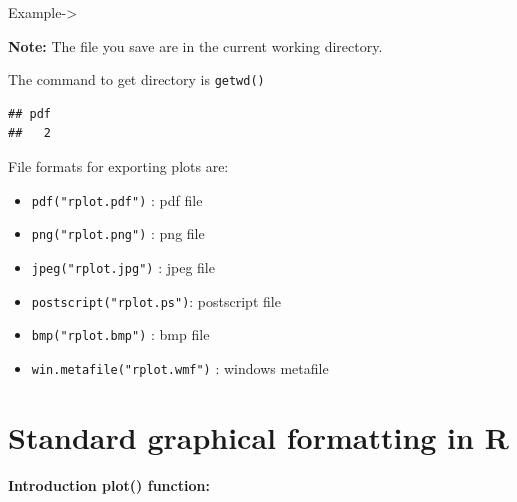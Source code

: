 \documentclass[]{book}
\newenvironment{Shaded}{\begin{snugshade}}{\end{snugshade}}
\newcommand{\KeywordTok}[1]{\textcolor[rgb]{0.13,0.29,0.53}{\textbf{#1}}}
\newcommand{\DataTypeTok}[1]{\textcolor[rgb]{0.13,0.29,0.53}{#1}}
\newcommand{\DecValTok}[1]{\textcolor[rgb]{0.00,0.00,0.81}{#1}}
\newcommand{\StringTok}[1]{\textcolor[rgb]{0.31,0.60,0.02}{#1}}
\newcommand{\CommentTok}[1]{\textcolor[rgb]{0.56,0.35,0.01}{\textit{#1}}}
\newcommand{\OtherTok}[1]{\textcolor[rgb]{0.56,0.35,0.01}{#1}}
\newcommand{\OperatorTok}[1]{\textcolor[rgb]{0.81,0.36,0.00}{\textbf{#1}}}
\newcommand{\NormalTok}[1]{#1}
\begin{document}
Example-\textgreater{}

\textbf{Note:} The file you save are in the current working directory.

The command to get directory is \texttt{getwd()}

\begin{Shaded}
\end{Shaded}

\begin{verbatim}
## pdf 
##   2
\end{verbatim}

File formats for exporting plots are:

\begin{itemize}
\item
  \texttt{pdf("rplot.pdf")} : pdf file
\item
  \texttt{png("rplot.png")} : png file
\item
  \texttt{jpeg("rplot.jpg")} : jpeg file
\item
  \texttt{postscript("rplot.ps")}: postscript file
\item
  \texttt{bmp("rplot.bmp")} : bmp file
\item
  \texttt{win.metafile("rplot.wmf")} : windows metafile
\end{itemize}

\chapter{Standard graphical formatting in
R}\label{standard-graphical-formatting-in-r}

\textbf{Introduction plot() function: }
\end{document}
